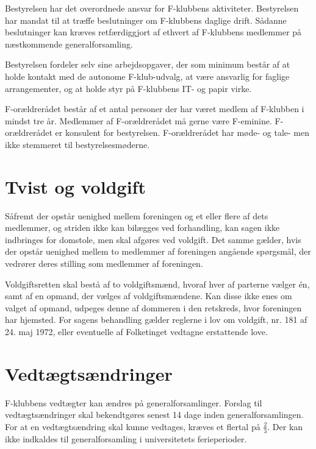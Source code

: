 \documentclass[a4paper,12pt,danish]{article}
\begin{document}
\begin{list}
\item Bestyrelsen har det overordnede ansvar for F-klubbens
  aktiviteter. Bestyrelsen har mandat til at træffe beslutninger om
  F-klubbens daglige drift. Sådanne beslutninger kan kræves
  retfærdiggjort af ethvert af F-klubbens medlemmer på næstkommende
  generalforsamling.

  
\item Bestyrelsen fordeler selv sine arbejdsopgaver, der som minimum
  består af at holde kontakt med de autonome F-klub-udvalg, at
  være ansvarlig for faglige arrangementer, og at holde styr på
  F-klubbens IT- og papir virke.


\item F-orældrerådet består af et antal
  personer der har været medlem af F-klubben i mindst tre år.
  Medlemmer af F-orældrerådet må gerne være F-eminine.
  F-orældrerådet er konsulent for bestyrelsen. F-orældrerådet
  har møde- og tale- men ikke stemmeret til bestyrelsesmøderne.

\section{Tvist og voldgift}

\item Såfremt der opstår uenighed mellem foreningen og et
  eller flere af dets medlemmer, og striden ikke kan bilægges ved
  forhandling, kan sagen ikke indbringes for domstole, men skal
  afgøres ved voldgift. Det samme gælder, hvis der opstår
  uenighed mellem to medlemmer af foreningen angående
  spørgsmål, der vedrører deres stilling som medlemmer af
  foreningen. 
  
  Voldgiftsretten skal bestå af to voldgiftsmænd, hvoraf hver
  af parterne vælger \'{e}n, samt af en opmand, der vælges af
  voldgiftsmændene. Kan disse ikke enes om valget af opmand,
  udpeges denne af dommeren i den retskreds, hvor foreningen har
  hjemsted. For sagens behandling gælder reglerne i lov om
  voldgift, nr. 181 af 24. maj 1972, eller eventuelle af Folketinget
  vedtagne erstattende love.

\section{Vedtægtsændringer}
  
\item F-klubbens vedtægter kan ændres på
  generalforsamlinger. Forslag til vedtægtsændringer skal
  bekendtgøres senest 14 dage inden generalforsamlingen. For at en
  vedtægtsændring skal kunne vedtages, kræves et flertal
  på $\frac{2}{3}$.
  Der kan ikke indkaldes til generalforsamling i universitetets ferieperioder.

\end{list}
\end{document}
